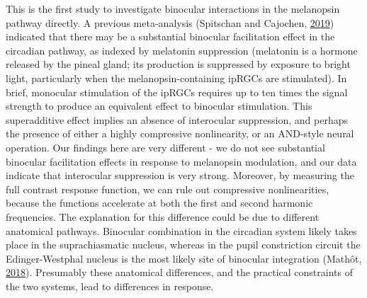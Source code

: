 \documentclass[
]{article}
\begin{document}
This is the first study to investigate binocular interactions in the melanopsin pathway directly. A previous meta-analysis (Spitschan and Cajochen, \protect\hyperlink{ref-Spitschan2019}{2019}) indicated that there may be a substantial binocular facilitation effect in the circadian pathway, as indexed by melatonin suppression (melatonin is a hormone released by the pineal gland; its production is suppressed by exposure to bright light, particularly when the melanopsin-containing ipRGCs are stimulated). In brief, monocular stimulation of the ipRGCs requires up to ten times the signal strength to produce an equivalent effect to binocular stimulation. This superadditive effect implies an absence of interocular suppression, and perhaps the presence of either a highly compressive nonlinearity, or an AND-style neural operation. Our findings here are very different - we do not see substantial binocular facilitation effects in response to melanopsin modulation, and our data indicate that interocular suppression is very strong. Moreover, by measuring the full contrast response function, we can rule out compressive nonlinearities, because the functions accelerate at both the first and second harmonic frequencies. The explanation for this difference could be due to different anatomical pathways. Binocular combination in the circadian system likely takes place in the suprachiasmatic nucleus, whereas in the pupil constriction circuit the Edinger-Westphal nucleus is the most likely site of binocular integration (Mathôt, \protect\hyperlink{ref-Mathot2018}{2018}). Presumably these anatomical differences, and the practical constraints of the two systems, lead to differences in response.
\end{document}
